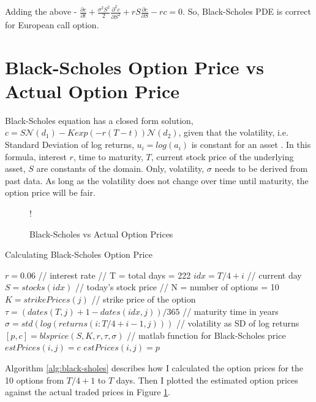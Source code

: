 \documentclass[11pt, fleqn]{article}
\begin{document}
Adding the above - $\frac{\partial c}{\partial t} + \frac{\sigma^2S^2}{2}\frac{\partial^2 c}{\partial S^2} + rS\frac{\partial c}{\partial S} - rc = 0$. So, Black-Scholes PDE is correct for European call option.

\section{Black-Scholes Option Price vs Actual Option Price}

Black-Scholes equation has a closed form solution, $c = S\mathcal{N}(d_1) - Kexp(-r(T-t))\mathcal{N}(d_2)$, given that the volatility, i.e. Standard Deviation of log returns, $u_i = log(a_i)$ is constant for an asset \cite{hull}. In this formula, interest $r$, time to maturity, $T$, current stock price of the underlying asset, $S$ are constants of the domain. Only, volatility, $\sigma$ needs to be derived from past data. As long as the volatility does not change over time until maturity, the option price will be fair.

\begin{figure}[!h]
\begin{center}
	\resizebox {0.6\textwidth} {!} { }
	\caption{Black-Scholes vs Actual Option Prices}
	\label{fig:q2-prices}
	\vspace{-0.8cm}
\end{center}
\end{figure}

\begin{algorithm}[H]
\caption{Calculating Black-Scholes Option Price}
\label{alg:black-sholes}
\begin{algorithmic}
\State $r = 0.06$ // interest rate
 // T = total days = 222
\State $idx = T/4 + i$ // current day
\State $S = stocks(idx)$ // today's stock price
 // N = number of options = 10
\State $K = strikePrices(j)$ // strike price of the option
\State $\tau = (dates(T,j)+1 - dates(idx,j))/365$ // maturity time in years
\State $\sigma = std(log(returns(i:T/4+i-1, j)))$ // volatility as SD of log returns
\State $[p, c] = blsprice(S, K, r, \tau, \sigma)$ // matlab function for Black-Scholes price
\State $estPrices(i,j) = c$
\Else
\State $estPrices(i,j) = p$
\EndIf
\EndFor
\EndFor
\end{algorithmic}
\end{algorithm}

Algorithm \ref{alg:black-sholes} describes how I calculated the option prices for the 10 options from $T/4 + 1$ to $T$ days. Then I plotted the estimated option prices against the actual traded prices in Figure \ref{fig:q2-prices}.
\end{document}
